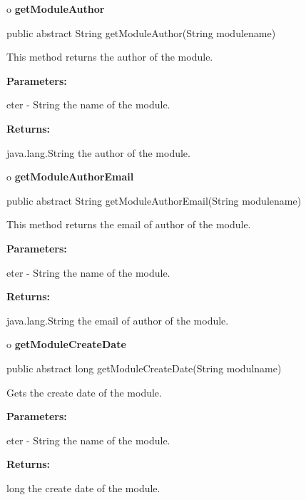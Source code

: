 o {\bf getModuleAuthor} 

\begin{PRE}
 public abstract String getModuleAuthor(String modulename)
\end{PRE}

\begin{description}
\htmlDD This method returns the author of the module. 

\begin{description}
\item {\bf Parameters:}  

eter - String the name of the module.  
\item {\bf Returns:}  

java.lang.String the author of the module.  
\end{description}

\end{description}

o {\bf getModuleAuthorEmail} 

\begin{PRE}
 public abstract String getModuleAuthorEmail(String modulename)
\end{PRE}

\begin{description}
\htmlDD This method returns the email of author of the module. 

\begin{description}
\item {\bf Parameters:}  

eter - String the name of the module.  
\item {\bf Returns:}  

java.lang.String the email of author of the module.  
\end{description}

\end{description}

o {\bf getModuleCreateDate} 

\begin{PRE}
 public abstract long getModuleCreateDate(String modulname)
\end{PRE}

\begin{description}
\htmlDD Gets the create date of the module. 

\begin{description}
\item {\bf Parameters:}  

eter - String the name of the module.  
\item {\bf Returns:}  

long the create date of the module.  
\end{description}

\end{description}

